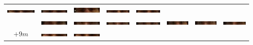 \begin{tabular}{|c|c|c|c|c|c|c|c|}
\includegraphics[width=0.115\linewidth]{Auge1/A_Img10-3FalkoE.png} &
\includegraphics[width=0.115\linewidth]{Auge1/A_Img10-4FalkoE.png} &
\includegraphics[width=0.115\linewidth]{Auge1/A_Img10-5FalkoE.png} &
\includegraphics[width=0.115\linewidth]{Auge1/A_Img10-6FalkoE.png} &
\includegraphics[width=0.115\linewidth]{Auge1/A_Img10-7FalkoE.png} \\&
\includegraphics[width=0.115\linewidth]{Auge1/A_Img10-1ThomasE.png} &
\includegraphics[width=0.115\linewidth]{Auge1/A_Img10-2ThomasE.png} &
\includegraphics[width=0.115\linewidth]{Auge1/A_Img10-3ThomasE.png} &
\includegraphics[width=0.115\linewidth]{Auge1/A_Img10-4ThomasE.png} &
\includegraphics[width=0.115\linewidth]{Auge1/A_Img10-5ThomasE.png} &
\includegraphics[width=0.115\linewidth]{Auge1/A_Img10-6ThomasE.png} &
\includegraphics[width=0.115\linewidth]{Auge1/A_Img10-7ThomasE.png} \\\hline 
$+9m$&
\includegraphics[width=0.115\linewidth]{Auge1/A_Img9-1FalkoE.png} &
\includegraphics[width=0.115\linewidth]{Auge1/A_Img9-2FalkoE.png} &

\end{tabular}
